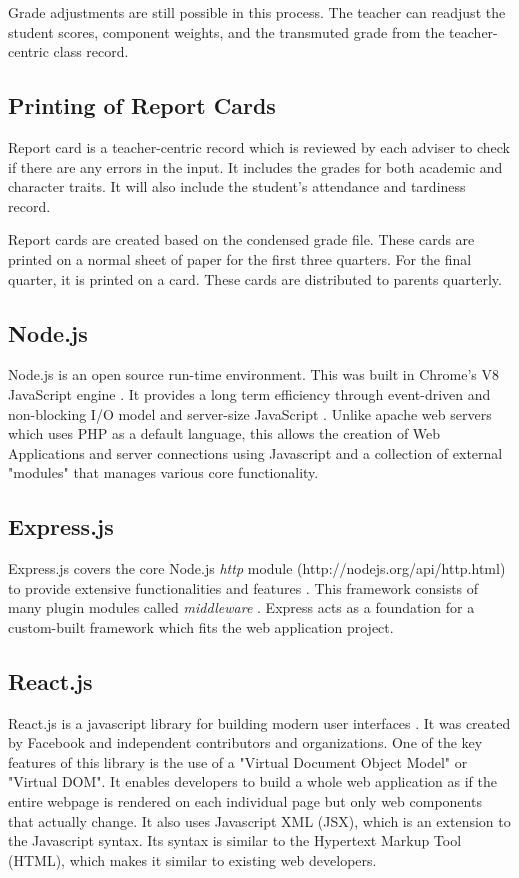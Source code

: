 \documentclass[11pt,a4paper,titlepage]{article}
\begin{document}
Grade adjustments are still possible in this process. The teacher can readjust the student scores, component weights, and the transmuted grade from the teacher-centric class record.

\subsection{Printing of Report Cards}

Report card is a teacher-centric record which is reviewed by each adviser to check if there are any errors in the input. It includes the grades for both academic and character traits. It will also include the student's attendance and tardiness record.

Report cards are created based on the condensed grade file. These cards are printed on a normal sheet of paper for the first three quarters. For the final quarter, it is printed on a card. These cards are distributed to parents quarterly.

\subsection{Node.js}

Node.js is an open source run-time environment. This was built in Chrome's V8 JavaScript engine \cite{Shah}. It provides a long term efficiency through event-driven and non-blocking I/O model and server-size JavaScript \cite{Joyent}. Unlike apache web servers which uses PHP as a default language, this allows the creation of Web Applications and server connections using Javascript and a collection of external "modules" that manages various core functionality.  

\subsection{Express.js}

Express.js covers the core Node.js \textit{http} module (http://nodejs.org/api/http.html) to provide extensive functionalities and features \cite{Mardan}. This framework consists of many plugin modules called \textit{middleware} \cite{Mardan}. Express acts as a foundation for a custom-built framework which fits the web application project.

\subsection{React.js}

React.js is a javascript library for building modern user interfaces \cite{Nahar}. It was created by Facebook and independent contributors and organizations. One of the key features of this library is the use of a "Virtual Document Object Model" or "Virtual DOM". It enables developers to build a whole web application as if the entire webpage is rendered on each individual page but only web components that actually change. It also uses Javascript XML (JSX), which is an extension to the Javascript syntax. Its syntax is similar to the Hypertext Markup Tool (HTML), which makes it similar to existing web developers.
\end{document}
